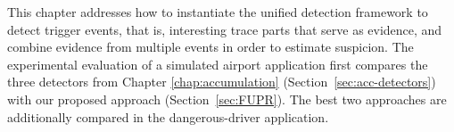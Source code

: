 
This chapter addresses how to instantiate the unified detection framework to detect trigger events, that is, interesting trace parts  that serve as evidence, and combine evidence from multiple events in order to estimate suspicion. 
%
%
The experimental evaluation of a simulated airport application first compares the three detectors from Chapter \ref{chap:accumulation} (Section~\ref{sec:acc-detectors}) with our proposed approach (Section~\ref{sec:FUPR}). The best two approaches are additionally compared in the dangerous-driver application.




